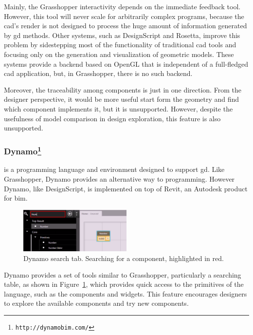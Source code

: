 Mainly, the Grasshopper interactivity depends on the immediate feedback tool. However, this tool will never scale for arbitrarily complex programs, because the \ac{cad}'s render is not designed to process the huge amount of information generated by \ac{gd} methods. Other systems, such as DesignScript and Rosetta, improve this problem by sidestepping most of the functionality of traditional \ac{cad} tools and focusing only on the generation and visualization of geometric models. These systems provide a backend based on OpenGL that is independent of a full-fledged \ac{cad} application, but, in Grasshopper, there is no such backend.

Moreover, the traceability among components is just in one direction. From the designer perspective, it would be more useful start form the geometry and find which component implements it, but it is unsupported. However, despite the usefulness of model comparison in design exploration, this feature is also unsupported.
\subsubsection{Dynamo\protect\footnote{\texttt{http://dynamobim.com/}}} is a programming language and environment designed to support \ac{gd}. Like Grasshopper, Dynamo provides an alternative way to programming. However Dynamo, like DesignScript, is implemented on top of Revit, an Autodesk product for \ac{bim}.

\begin{figure}
  \vspace{-30pt}
  \begin{center}
    \includegraphics[width=0.5\textwidth]{img/dynam-tab}
  \end{center}
  \vspace{-18pt}
 \caption{Dynamo search tab. Searching for a component, highlighted in red.}  
  \vspace{-20pt}
    \label{fig:dynam}
\end{figure}

Dynamo provides a set of tools similar to Grasshopper, particularly a searching table, as shown in Figure~\ref{fig:dynam}, which provides quick access to the primitives of the language, such as the components and widgets. This feature encourages designers to explore the available components and try new components.

